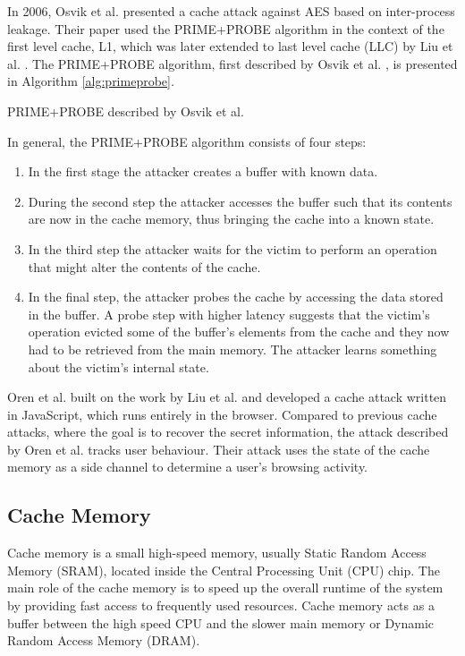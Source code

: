 \documentclass[10pt,a4paper,twoside]{book}
\begin{document}
In 2006, Osvik et al.\cite{osvik2006cache} presented a cache attack against AES based on inter-process leakage. Their paper used the PRIME+PROBE algorithm in the context of the first level cache, L1, which was later extended to last level cache (LLC) by Liu et al. \cite{liu2015last}. The PRIME+PROBE algorithm, first described by Osvik et al. \cite{osvik2006cache}, is presented in Algorithm \ref{alg:primeprobe}.

\begin{algorithm}
\caption{PRIME+PROBE described by Osvik et al.\cite{osvik2006cache} }
\label{alg:primeprobe}
In general, the PRIME+PROBE algorithm consists of four steps:
\begin{enumerate}
\item In the first stage the attacker creates a buffer with known data.
\item During the second step the attacker accesses the buffer such that its contents are now in the cache memory, thus bringing the cache into a known state.
\item In the third step the attacker waits for the victim to perform an operation that might alter the contents of the cache.
\item In the final step, the attacker probes the cache by accessing the data stored in the buffer. A probe step with higher latency suggests that the victim's operation evicted some of the buffer's elements from the cache and they now had to be retrieved from the main memory. The attacker learns something about the victim's internal state.
\end{enumerate}
\end{algorithm}

Oren et al.\cite{oren2015spy} built on the work by Liu et al. \cite{liu2015last} and developed a cache attack written in JavaScript, which runs entirely in the browser. Compared to previous cache attacks, where the goal is to recover the secret information, the attack described by Oren et al. \cite{oren2015spy} tracks user behaviour. Their attack uses the state of the cache memory as a side channel to determine a user's browsing activity.

\subsection{Cache Memory}
\label{cachememorytb}

Cache memory is a small high-speed memory, usually Static Random Access Memory (SRAM), located inside the Central Processing Unit (CPU) chip. The main role of the cache memory is to speed up the overall runtime of the system by providing fast access to frequently used resources. Cache memory acts as a buffer between the high speed CPU and the slower main memory or Dynamic Random Access Memory (DRAM).
\end{document}
